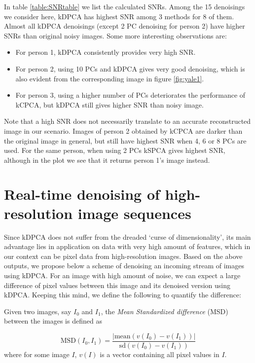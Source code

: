 \documentclass[10pt, conference, compsocconf]{IEEEtran}
\begin{document}
In table \ref{table:SNRtable} we list the calculated SNRs. Among the 15 denoisings we consider here, kDPCA has highest SNR among 3 methods for 8 of them. Almost all kDPCA denoisings (except 2 PC denoising for person 2) have higher SNRs than original noisy images. Some more interesting observations are:

\begin{itemize}
\item For person 1, kDPCA consistently provides very high SNR.
\item For person 2, using 10 PCs and kDPCA gives very good denoising, which is also evident from the corresponding image in figure \ref{fig:yale1}.
\item For person 3, using a higher number of PCs deteriorates the performance of kCPCA, but kDPCA still gives higher SNR than noisy image.
\end{itemize}

Note that a high SNR does not necessarily translate to an accurate reconstructed image in our scenario. Images of person 2 obtained by kCPCA are darker than the original image in general, but still have highest SNR when 4, 6 or 8 PCs are used. For the same person, when using 2 PCs kSPCA gives highest SNR, although in the plot we see that it returns person 1's image instead.

\section{Real-time denoising of high-resolution image sequences}

Since kDPCA does not suffer from the dreaded `curse of dimensionality', its main advantage lies in application on data with very high amount of features, which in our context can be pixel data from high-resolution images. Based on the above outputs, we propose below a scheme of denoising an incoming stream of images using kDPCA. For an image with high amount of noise, we can expect a large difference of pixel values between this image and its denoised version using kDPCA. Keeping this mind, we define the following to quantify the difference:

\begin{definition}
Given two images, say $I_0$ and $I_1$, the \textit{Mean Standardized difference} (MSD) between the images is defined as

\begin{equation}
\text{MSD}(I_0, I_1) = \frac{| \text{mean} (v(I_0) - v(I_1)) |}{\text{sd}(v(I_0) - v(I_1))}
\end{equation}
where for some image $I$, $v(I)$ is a vector containing all pixel values in $I$.
\end{definition}
\end{document}
